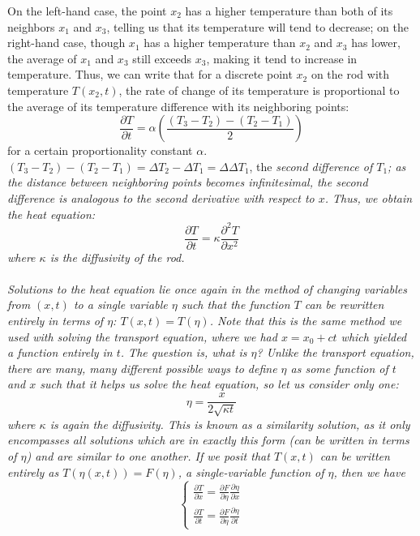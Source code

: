 \documentclass{article}
\begin{document}
On the left-hand case, the point $x_2$ has a higher temperature than both of its neighbors $x_1$ and $x_3$, telling us that its temperature will tend to decrease; on the right-hand case, though $x_1$ has a higher temperature than $x_2$ and $x_3$ has lower, the average of $x_1$ and $x_3$ still exceeds $x_3$, making it tend to increase in temperature. Thus, we can write that for a discrete point $x_2$ on the rod with temperature $T(x_2,t)$, the rate of change of its temperature is proportional to the average of its temperature difference with its neighboring points:
\begin{equation*}
    \frac{\partial T}{\partial t} = \alpha(\frac{(T_3-T_2)-(T_2-T_1)}{2})
\end{equation*}
for a certain proportionality constant $\alpha$. $(T_3-T_2)-(T_2-T_1) = \Delta T_2 - \Delta T_1 = \Delta \Delta T_1$, the \it second difference \normalfont of $T_1$; as the distance between neighboring points becomes infinitesimal, the second difference is analogous to the second derivative with respect to $x$. Thus, we obtain the heat equation: 
\begin{equation*}
    \frac{\partial T}{\partial t}=\kappa \frac{\partial^2 T}{\partial x^2}
\end{equation*}
where $\kappa$ is the \it diffusivity \normalfont of the rod. \\ \\
\newpage
Solutions to the heat equation lie once again in the method of changing variables from $(x,t)$ to a single variable $\eta$ such that the function $T$ can be rewritten entirely in terms of $\eta$: $T(x,t)=T(\eta)$. Note that this is the same method we used with solving the transport equation, where we had $x = x_0 + ct$ which yielded a function entirely in $t$. The question is, what is $\eta$? Unlike the transport equation, there are many, many different possible ways to define $\eta$ as some function of $t$ and $x$ such that it helps us solve the heat equation, so let us consider only one:
\begin{equation*}
    \eta = \frac{x}{2\sqrt{\kappa t}}
\end{equation*}
where $\kappa$ is again the diffusivity. This is known as a \it similarity solution, \normalfont as it only encompasses all solutions which are in exactly this form (can be written in terms of $\eta$) and are similar to one another. If we posit that $T(x,t)$ can be written entirely as $T(\eta(x,t))=F(\eta)$, a single-variable function of $\eta$, then we have
\begin{equation*}
    \begin{cases}
        \frac{\partial T}{\partial x} = \frac{\partial F}{\partial \eta} \frac{\partial \eta}{\partial x} \\
        \frac{\partial T}{\partial t} = \frac{\partial F}{\partial \eta} \frac{\partial \eta}{\partial t}
    \end{cases}
\end{equation*}
\end{document}
